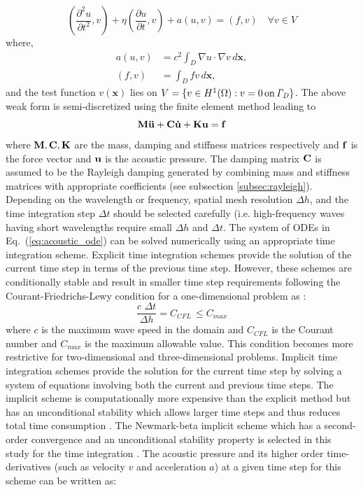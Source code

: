 \documentclass{article}
\begin{document}
\begin{equation}
(\frac{\partial^2 u}{\partial t^2} , v) + \eta (\frac{\partial u}{\partial t} , v) + a(u, v) = (f, v) \quad \forall v \in V
\end{equation}
where,
\begin{align*}
    a(u, v) &= c^2 \int_{D} {\nabla u \cdot \nabla v} \, d \mathbf{x},\\
(f, v) &= \int_{D} fv \, d \mathbf{x},
\end{align*}
and the test function $v(\mathbf{x})$ lies on $V = \{ v \in H^1({\Omega}) : v = 0 \, \mathrm{on} \, \it{\Gamma}_D \}$.
The above weak form is semi-discretized using the finite element method leading to \cite{zampieri2006implicit,bathe_1}
\begin{equation} \label{eq:acoustic_ode}
  \bf{M} \ddot{u} + \bf{C} \dot{u} + \bf{K} u = f  
\end{equation}
where $\bf{M},\bf{C},\bf{K}$ are the mass, damping and stiffness matrices respectively and $\bf{f}$ is the force vector and $\bf{u}$ is the acoustic pressure. The damping matrix $\bf{C}$ is assumed to be the Rayleigh damping generated by combining mass and stiffness matrices with appropriate coefficients \cite{humar} (see subsection \ref{subsec:rayleigh}). Depending on the wavelength or frequency, spatial mesh resolution $\Delta h$, and the time integration step $\Delta t$ should be selected carefully (i.e. high-frequency waves having short wavelengths require small $\Delta h$ and $\Delta t$.
The system of ODEs in Eq.~(\ref{eq:acoustic_ode}) can be solved numerically using an appropriate time integration scheme. Explicit time integration schemes provide the solution of the current time step in terms of the previous time step. However, these schemes are conditionally stable and result in smaller time step requirements following the Courant-Friedrichs-Lewy condition for a one-dimensional problem as \cite{bathe_1,farhat_nasa,book_nonlinear}:
\begin{equation}\label{Eq.CFL}
\frac{c \,\, \Delta t}{\Delta h} = C_{CFL} \, \leq C_{max}
\end{equation}
where $c$ is the maximum wave speed in the domain and $C_{CFL}$ is the Courant number and $C_{max}$ is the maximum allowable value. This condition becomes more restrictive for two-dimensional and three-dimensional problems.
Implicit time integration schemes provide the solution for the current time step by solving a system of equations involving both the current and previous time steps. The implicit scheme is computationally more expensive than the explicit method but has an unconditional stability which allows larger time steps and thus reduces total time consumption \cite{bathe_1, bathe_2}. The Newmark-beta implicit scheme which has a second-order convergence and an unconditional stability property is selected in this study for the time integration \cite{book_hughes,bathe_book}. The acoustic pressure and its higher order time-derivatives (such as velocity $v$ and acceleration $a$) at a given time step for this scheme can be written as\cite{book_hughes}:
\end{document}
